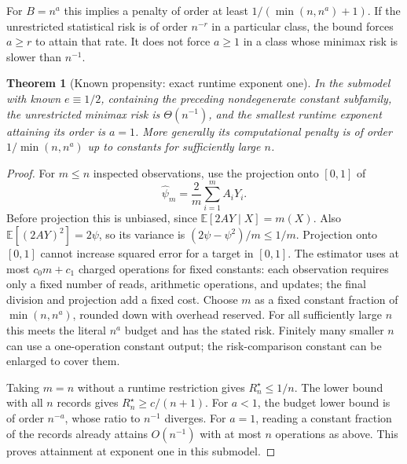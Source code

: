 \documentclass[11pt,a4paper]{article}
\newcommand{\E}{\mathbb E}
\newtheorem{theorem}{Theorem}
\theoremstyle{definition}
\begin{document}
For $B=n^a$ this implies a penalty of order at least $1/(\min(n,n^a)+1)$. If the unrestricted statistical risk is of order $n^{-r}$ in a particular class, the bound forces $a\ge r$ to attain that rate. It does not force $a\ge1$ in a class whose minimax risk is slower than $n^{-1}$.

\begin{theorem}[Known propensity: exact runtime exponent one]
In the submodel with known $e\equiv1/2$, containing the preceding nondegenerate constant subfamily, the unrestricted minimax risk is $\Theta(n^{-1})$, and the smallest runtime exponent attaining its order is $a=1$. More generally its computational penalty is of order $1/\min(n,n^a)$ up to constants for sufficiently large $n$.
\end{theorem}
\begin{proof}
For $m\le n$ inspected observations, use the projection onto $[0,1]$ of
\[
 \widehat\psi_m=\frac2m\sum_{i=1}^m A_iY_i.
\]
Before projection this is unbiased, since $\E[2AY\mid X]=m(X)$. Also $\E[(2AY)^2]=2\psi$, so its variance is $(2\psi-\psi^2)/m\le1/m$. Projection onto $[0,1]$ cannot increase squared error for a target in $[0,1]$. The estimator uses at most $c_0m+c_1$ charged operations for fixed constants: each observation requires only a fixed number of reads, arithmetic operations, and updates; the final division and projection add a fixed cost. Choose $m$ as a fixed constant fraction of $\min(n,n^a)$, rounded down with overhead reserved. For all sufficiently large $n$ this meets the literal $n^a$ budget and has the stated risk. Finitely many smaller $n$ can use a one-operation constant output; the risk-comparison constant can be enlarged to cover them.

Taking $m=n$ without a runtime restriction gives $R_n^\star\le1/n$. The lower bound with all $n$ records gives $R_n^\star\ge c/(n+1)$. For $a<1$, the budget lower bound is of order $n^{-a}$, whose ratio to $n^{-1}$ diverges. For $a=1$, reading a constant fraction of the records already attains $O(n^{-1})$ with at most $n$ operations as above. This proves attainment at exponent one in this submodel.
\end{proof}
\end{document}
